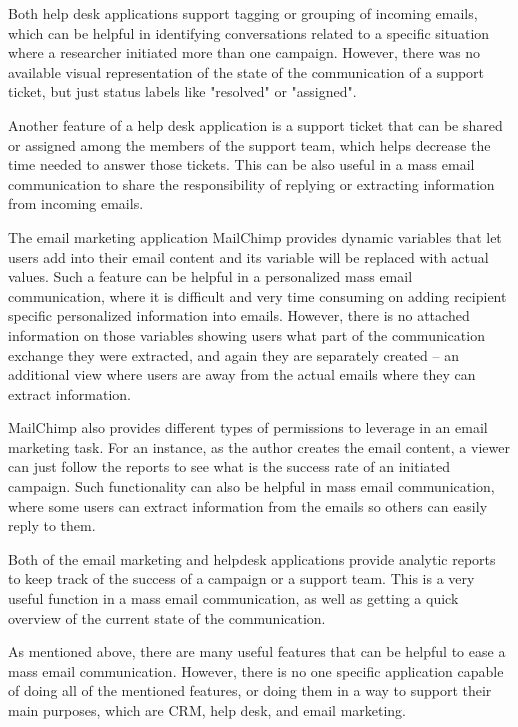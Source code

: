 \begin{compactitem}
	\item Both help desk applications support tagging or grouping of incoming emails, which can be helpful in identifying conversations related to a specific situation where a researcher initiated more than one campaign. However, there was no available visual representation of the state of the communication of a support ticket, but just status labels like "resolved" or "assigned".
	\item Another feature of a help desk application is a support ticket that can be shared or assigned among the members of the support team, which helps decrease the time needed to answer those tickets. This can be also useful in a mass email communication to share the responsibility of replying or extracting information from incoming emails.
	\item The email marketing application MailChimp provides dynamic variables that let users add into their email content and its variable will be replaced with actual values. Such a feature can be helpful in a personalized mass email communication, where it is difficult and very time consuming on adding recipient specific personalized information into emails. However, there is no attached information on those variables showing users what part of the communication exchange they were extracted, and again they are separately created -- an additional view where users are away from the actual emails where they can extract information.
	\item MailChimp also provides different types of permissions to leverage in an email marketing task. For an instance, as the author creates the email content, a viewer can just follow the reports to see what is the success rate of an initiated campaign. Such functionality can also be helpful in mass email communication, where some users can extract information from the emails so others can easily reply to them.
	\item Both of the email marketing and helpdesk applications provide analytic reports to keep track of the success of a campaign or a support team. This is a very useful function in a mass email communication, as well as getting a quick overview of the current state of the communication.
\end{compactitem}

As mentioned above, there are many useful features that can be helpful to ease a mass email communication. However, there is no one specific application capable of doing all of the mentioned features, or doing them in a way to support their main purposes, which are \ac{CRM}, help desk, and email marketing.

